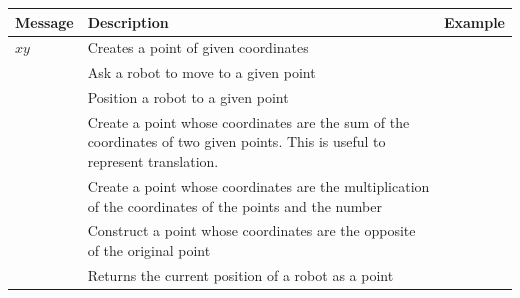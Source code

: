 \begin{table}[h]
  \centering
\begin{tabular}{| l | p{8cm} | l |} \hline
  \hfil Message & \hfil Description & \hfil Example \\[1ex] \hline
  $x$\ct{\ @\ }$y$ & Creates a point of given coordinates &
  \ct{300\ @\ 600} \\
  \ct{goTo: aPoint} & Ask a robot to move to a given point & \ct{pica\ goTo:\ 300\ @\ 600} \\
  \ct{jumpTo: aPoint} & Position a robot to a given point & \ct{pica\ jumpTo:\ 300\ @\ 600} \\
  \ct{point1 + point2} & Create a point whose coordinates are the sum of the coordinates of two given points. This is useful to represent translation. & \ct{50\ @\ 200\ +\ 300\ @\ 600} \\
 \ct{point1 * number} & Create a point whose coordinates are the multiplication of the coordinates of the points and the number & \ct{(50\ @\ 200) *3} \\
  \ct{point1 negated} & Construct a point whose coordinates are the opposite of the original point & \ct{(50\ @\ 200)\ negated} \\
  \ct{center} & Returns the current position of a robot as a point & \ct{barPoint\ :=\ pica\ center} \\
  \hline
\end{tabular}
\end{table}


\ifx\wholebook\relax\else\fi






